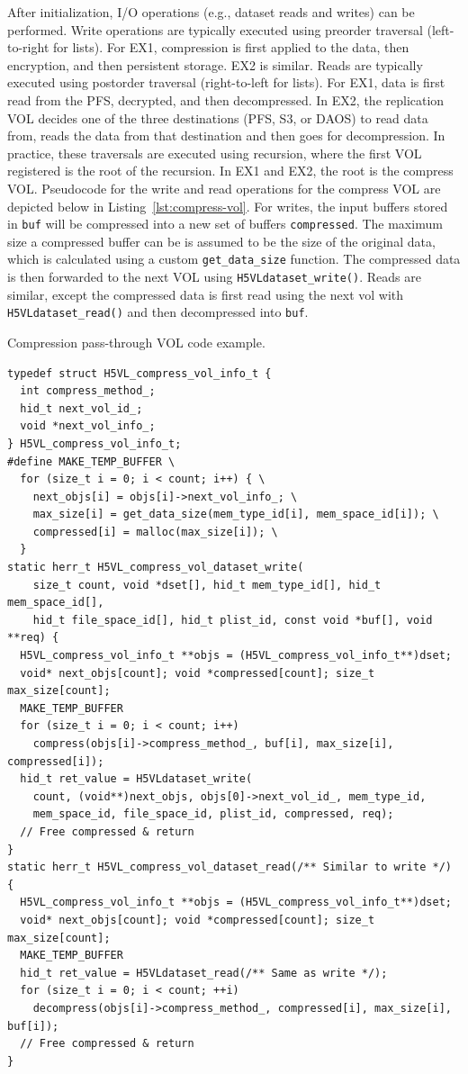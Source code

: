 After initialization, I/O operations (e.g., dataset reads and writes) can be performed. Write operations are typically executed using preorder traversal (left-to-right for lists). For EX1, compression is first applied to the data, then encryption, and then persistent storage. EX2 is similar. Reads are typically executed using postorder traversal (right-to-left for lists). For EX1, data is first read from the PFS, decrypted, and then decompressed. In EX2, the replication VOL decides one of the three destinations (PFS, S3, or DAOS) to read data from, reads the data from that destination and then goes for decompression. In practice, these traversals are executed using recursion, where the first VOL registered is the root of the recursion. In EX1 and EX2, the root is the compress VOL. Pseudocode for the write and read operations for the compress VOL are depicted below in Listing~\ref{lst:compress-vol}. For writes, the input buffers stored in \texttt{buf} will be compressed into a new set of buffers \texttt{compressed}. The maximum size a compressed buffer can be is assumed to be the size of the original data, which is calculated using a custom \texttt{get\_data\_size} function. The compressed data is then forwarded to the next VOL using \texttt{H5VLdataset\_write()}. Reads are similar, except the compressed data is first read using the next vol with \texttt{H5VLdataset\_read()} and then decompressed into \texttt{buf}.

\begin{listing}[!ht]
\centering
\caption{Compression pass-through VOL code example.}
\label{lst:compress-vol}
\begin{verbatim}
typedef struct H5VL_compress_vol_info_t {
  int compress_method_;
  hid_t next_vol_id_;
  void *next_vol_info_;
} H5VL_compress_vol_info_t;
#define MAKE_TEMP_BUFFER \
  for (size_t i = 0; i < count; i++) { \
    next_objs[i] = objs[i]->next_vol_info_; \
    max_size[i] = get_data_size(mem_type_id[i], mem_space_id[i]); \
    compressed[i] = malloc(max_size[i]); \
  }
static herr_t H5VL_compress_vol_dataset_write(
    size_t count, void *dset[], hid_t mem_type_id[], hid_t mem_space_id[],
    hid_t file_space_id[], hid_t plist_id, const void *buf[], void **req) {
  H5VL_compress_vol_info_t **objs = (H5VL_compress_vol_info_t**)dset;
  void* next_objs[count]; void *compressed[count]; size_t max_size[count];
  MAKE_TEMP_BUFFER
  for (size_t i = 0; i < count; i++)
    compress(objs[i]->compress_method_, buf[i], max_size[i], compressed[i]);
  hid_t ret_value = H5VLdataset_write(
    count, (void**)next_objs, objs[0]->next_vol_id_, mem_type_id, 
    mem_space_id, file_space_id, plist_id, compressed, req);
  // Free compressed & return
}
static herr_t H5VL_compress_vol_dataset_read(/** Similar to write */) {
  H5VL_compress_vol_info_t **objs = (H5VL_compress_vol_info_t**)dset;
  void* next_objs[count]; void *compressed[count]; size_t max_size[count];
  MAKE_TEMP_BUFFER
  hid_t ret_value = H5VLdataset_read(/** Same as write */);
  for (size_t i = 0; i < count; ++i)
    decompress(objs[i]->compress_method_, compressed[i], max_size[i], buf[i]);
  // Free compressed & return
}
\end{verbatim}
\end{listing}



